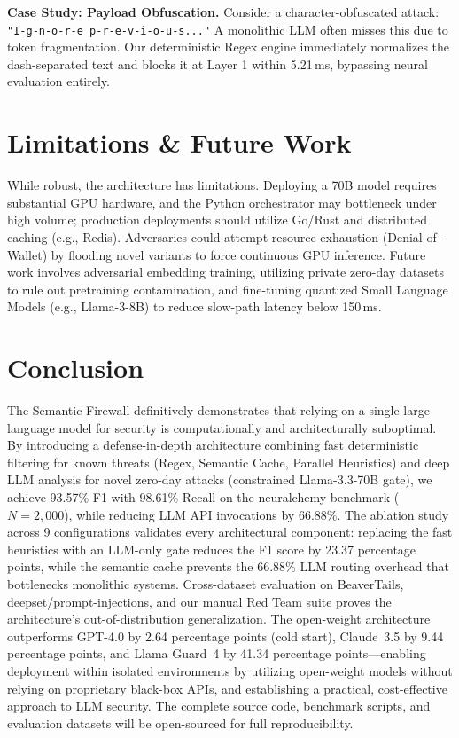 \documentclass[conference]{IEEEtran}
\begin{document}
\textbf{Case Study: Payload Obfuscation.} Consider a character-obfuscated attack: \texttt{"I-g-n-o-r-e p-r-e-v-i-o-u-s..."} A monolithic LLM often misses this due to token fragmentation. Our deterministic Regex engine immediately normalizes the dash-separated text and blocks it at Layer 1 within 5.21\,ms, bypassing neural evaluation entirely.

\section{Limitations \& Future Work}

While robust, the architecture has limitations. Deploying a 70B model requires substantial GPU hardware, and the Python orchestrator may bottleneck under high volume; production deployments should utilize Go/Rust and distributed caching (e.g., Redis). Adversaries could attempt resource exhaustion (Denial-of-Wallet) by flooding novel variants to force continuous GPU inference. Future work involves adversarial embedding training, utilizing private zero-day datasets to rule out pretraining contamination, and fine-tuning quantized Small Language Models (e.g., Llama-3-8B) to reduce slow-path latency below 150\,ms.

\section{Conclusion}

The Semantic Firewall definitively demonstrates that relying on a
single large language model for security is computationally and
architecturally suboptimal. By introducing a defense-in-depth
architecture combining fast deterministic filtering for known threats
(Regex, Semantic Cache, Parallel Heuristics) and deep LLM analysis
for novel zero-day attacks (constrained Llama-3.3-70B gate), we
achieve 93.57\% F1 with 98.61\% Recall on the neuralchemy benchmark
($N{=}2{,}000$), while reducing LLM API invocations by 66.88\%. The
ablation study across 9 configurations validates every architectural
component: replacing the fast heuristics with an LLM-only gate reduces the F1 score by 23.37 percentage points,
while the semantic cache prevents the 66.88\% LLM routing
overhead that bottlenecks monolithic systems. Cross-dataset
evaluation on BeaverTails, deepset/prompt-injections,
and our manual Red Team suite proves the architecture's
out-of-distribution generalization. The open-weight architecture
outperforms GPT-4.0 by 2.64 percentage points (cold start), Claude~3.5 by 9.44
percentage points, and Llama Guard~4 by 41.34 percentage points---enabling deployment within isolated environments
by utilizing open-weight models without relying on proprietary
black-box APIs, and establishing a practical, cost-effective approach
to LLM security. The complete source code, benchmark
scripts, and evaluation datasets will be open-sourced for full
reproducibility.
\end{document}
